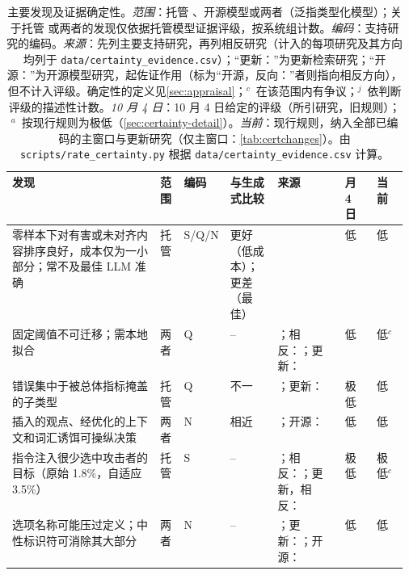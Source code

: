 \begin{table}[!htbp]
\centering
\footnotesize
\setlength{\tabcolsep}{3pt}
\caption{主要发现及证据确定性。\emph{范围}：托管 \jev{}、开源模型或两者（泛指类型化模型）；关于托管 \jev{} 或两者的发现仅依据托管模型证据评级，按系统组计数。\emph{编码}：支持研究的编码。\emph{来源}：先列主要支持研究，再列相反研究（计入的每项研究及其方向均列于 \nolinkurl{data/certainty_evidence.csv}）；“更新：”为更新检索研究；“开源：”为开源模型研究，起佐证作用（标为“开源，反向：”者则指向相反方向），但不计入评级。确定性的定义见\cref{sec:appraisal}；$^{c}$~在该范围内有争议；$^{j}$~依判断评级的描述性计数。\emph{10 月 4 日}：10 月 4 日给定的评级（所引研究，旧规则）；$^{a}$~按现行规则为极低（\cref{sec:certainty-detail}）。\emph{当前}：现行规则，纳入全部已编码的主窗口与更新研究（仅主窗口：\cref{tab:certchanges}）。由 \nolinkurl{scripts/rate_certainty.py} 根据 \nolinkurl{data/certainty_evidence.csv} 计算。}
\label{tab:keyfindings}
\begin{tabularx}{\linewidth}{@{}L>{\raggedright\arraybackslash}p{0.06\linewidth}>{\raggedright\arraybackslash}p{0.055\linewidth}>{\raggedright\arraybackslash}p{0.12\linewidth}>{\raggedright\arraybackslash}p{0.17\linewidth}>{\raggedright\arraybackslash}p{0.08\linewidth}>{\raggedright\arraybackslash}p{0.08\linewidth}@{}}
\toprule
发现 & 范围 & 编码 & 与生成式比较 & 来源 & 10 月 4 日 & 当前 \\
\midrule
零样本下对有害或未对齐内容排序良好，成本仅为一小部分；常不及最佳 LLM 准确 & 托管 & S/Q/N & 更好（低成本）；更差（最佳） & \cite{arx29429,jkf87_2026replication,zen22885291,arx33401,arx24574,arx27678} & 低 & 低 \\
固定阈值不可迁移；需本地拟合 & 两者 & Q & -- & \cite{arx29429,jkf87_2026replication,arx00346,arx01006,arx26550,arx24574,arx02046}；相反：\cite{arx33689}；更新：\cite{arx03387,arx02267,zen22935043} & 低 & 低$^{c}$ \\
错误集中于被总体指标掩盖的子类型 & 托管 & Q & 不一 & \cite{arx33401,alphaRAG,arx02046}；更新：\cite{arx07953,arx03324,arx08675,arx10321} & 极低 & 低 \\
插入的观点、经优化的上下文和词汇诱饵可操纵决策 & 两者 & N & 相近 & \cite{arx31142,arx01834,arx01006,arx30243,arx02048}；开源：\cite{zen22959854,zen23038928} & 低 & 低 \\
指令注入很少选中攻击者的目标（原始 1.8\%，自适应 3.5\%） & 托管 & S & -- & \cite{arx28613}；相反：\cite{arx31142,checkpoint2026jev}；更新，相反：\cite{arx04985} & 极低 & 极低$^{c}$ \\
选项名称可能压过定义；中性标识符可消除其大部分 & 两者 & N & -- & \cite{arx26758,arx00346}；更新：\cite{arx07953}；开源：\cite{arx02586} & 低 & 低 \\

\end{tabularx}
\end{table}

